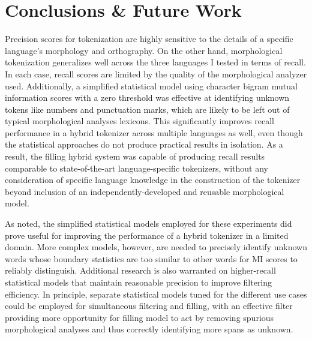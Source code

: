 \chapter{Conclusions \& Future Work}

Precision scores for tokenization are highly sensitive to the details of a specific language's morphology and orthography. On the other hand, morphological tokenization generalizes well across the three languages I tested in terms of recall. In each case, recall scores are limited by the quality of the morphological analyzer used. Additionally, a simplified statistical model using character bigram mutual information scores with a zero threshold was effective at identifying unknown tokens like numbers and punctuation marks, which are likely to be left out of typical morphological analyses lexicons. This significantly improves recall performance in a hybrid tokenizer across multiple languages as well, even though the statistical approaches do not produce practical results in isolation. As a result, the filling hybrid system was capable of producing recall results comparable to state-of-the-art language-specific tokenizers, without any consideration of specific language knowledge in the construction of the tokenizer beyond inclusion of an independently-developed and reusable morphological model.

As noted, the simplified statistical models employed for these experiments did prove useful for improving the performance of a hybrid tokenizer in a limited domain. More complex models, however, are needed to precisely identify unknown words whose boundary statistics are too similar to other words for MI scores to reliably distinguish. Additional research is also warranted on higher-recall statistical models that maintain reasonable precision to improve filtering efficiency. In principle, separate statistical models tuned for the different use cases could be employed for simultaneous filtering and filling, with an effective filter providing more opportunity for filling model to act by removing spurious morphological analyses and thus correctly identifying more spans as unknown.

